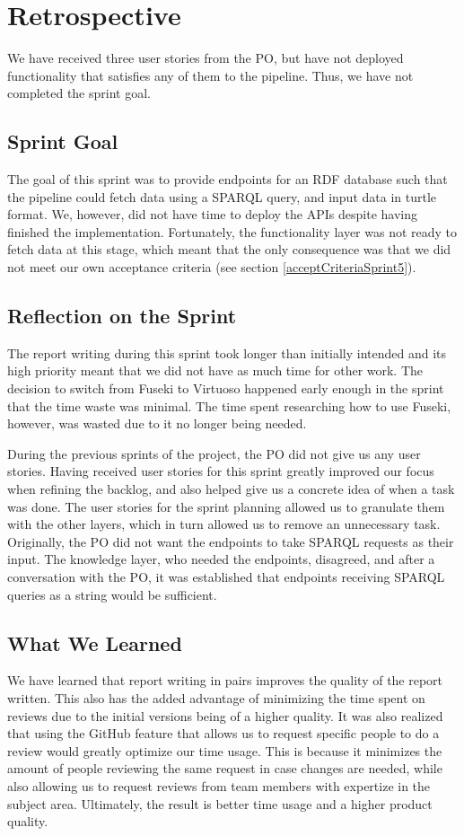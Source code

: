 \section{Retrospective}
We have received three user stories from the PO, but have not deployed functionality that satisfies any of them to the \knox{} pipeline. Thus, we have not completed the sprint goal.

\subsection{Sprint Goal}
The goal of this sprint was to provide endpoints for an RDF database such that the \knox{} pipeline could fetch data using a SPARQL query, and input data in turtle format. We, however, did not have time to deploy the APIs despite having finished the implementation. Fortunately, the functionality layer was not ready to fetch data at this stage, which meant that the only consequence was that we did not meet our own acceptance criteria (see section \ref{acceptCriteriaSprint5}).

\subsection{Reflection on the Sprint}
The report writing during this sprint took longer than initially intended and its high priority meant that we did not have as much time for other work.
The decision to switch from Fuseki to Virtuoso happened early enough in the sprint that the time waste was minimal. The time spent researching how to use Fuseki, however, was wasted due to it no longer being needed.

During the previous sprints of the project, the \knox{} PO did not give us any user stories. 
Having received user stories for this sprint greatly improved our focus when refining the backlog, and also helped give us a concrete idea of when a task was done. 
The user stories for the sprint planning allowed us to granulate them with the other layers, which in turn allowed us to remove an unnecessary task. Originally, the \knox{} PO did not want the endpoints to take SPARQL requests as their input.
The knowledge layer, who needed the endpoints, disagreed, and after a conversation with the \knox{} PO, it was established that endpoints receiving SPARQL queries as a string would be sufficient.

\subsection{What We Learned}
We have learned that report writing in pairs improves the quality of the report written. This also has the added advantage of minimizing the time spent on reviews due to the initial versions being of a higher quality.
It was also realized that using the GitHub feature that allows us to request specific people to do a review would greatly optimize our time usage. 
This is because it minimizes the amount of people reviewing the same request in case changes are needed, while also allowing us to request reviews from team members with expertize in the subject area.
Ultimately, the result is better time usage and a higher product quality. 

